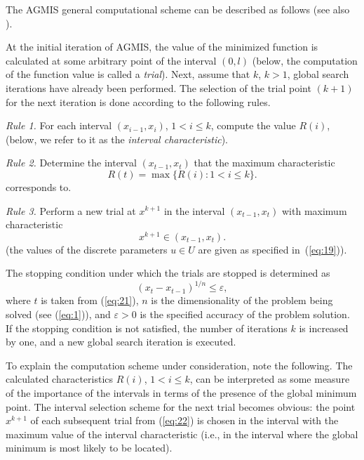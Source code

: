 \documentclass{svproc}
\begin{document}
The AGMIS general computational scheme can be described as follows (see also \cite{c21}).

At the initial iteration of AGMIS, the value of the minimized function is calculated at some arbitrary point of the interval $(0,l)$ (below, the computation of the function value is called a \textit{trial}). Next, assume that $k$, $k > 1$, global search iterations have already been performed. The selection of the trial point $(k+1)$ for the next iteration is done according to the following rules.

\textit{Rule 1.} For each interval $(x_{i-1}, x_i)$, $1<i \leq k$, compute the value $R(i)$, (below, we refer to it as the \textit{interval characteristic}).

\textit{Rule 2.} Determine the interval $(x_{t-1}, x_t)$ that the maximum characteristic
\begin{equation}\label{eq:21}
R(t)=\max\{R(i): 1<i\leq k\}.
\end{equation}
corresponds to.

\textit{Rule 3.} Perform a new trial at $x^{k+1}$ in the interval $(x_{t-1}, x_t)$ with maximum characteristic
\begin{equation}\label{eq:22}
x^{k+1} \in (x_{t-1}, x_t).
\end{equation}
(the values of the discrete parameters $u \in U$ are given as specified in~(\ref{eq:19})).

The stopping condition under which the trials are stopped is determined as
\begin{equation}\label{eq:23}
(x_t - x_{t-1})^{1/n} \leq \varepsilon,
\end{equation}
where $t$ is taken from (\ref{eq:21}), $n$ is the dimensionality of the problem being solved (see (\ref{eq:1})), and $\varepsilon > 0$ is the specified accuracy of the problem solution. If the stopping condition is not satisfied, the number of iterations $k$ is increased by one, and a new global search iteration is executed.

   To explain the computation scheme under consideration, note the following. The calculated characteristics $R(i)$, $1<i \leq k$, can be interpreted as some measure of the importance of the intervals in terms of the presence of the global minimum point. The interval selection scheme for the next trial becomes obvious: the point $x^{k+1}$ of each subsequent trial from (\ref{eq:22}) is chosen in the interval with the maximum value of the interval characteristic (i.e., in the interval where the global minimum is most likely to be located).
\end{document}
